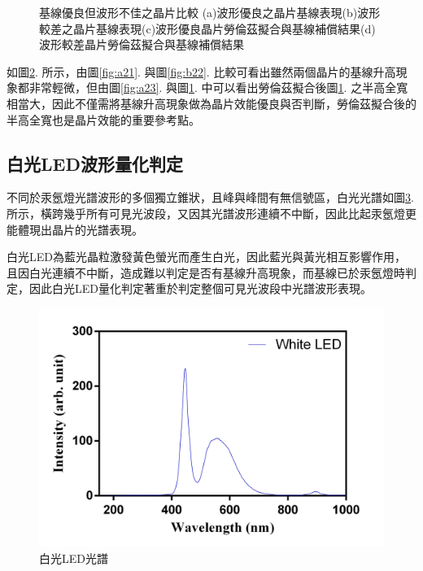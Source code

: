 \begin{figure}[H]
\begin{subfigure}[fig nice]{0.49\textwidth}
	\caption{}
	\label{fig:b24}
\end{subfigure}
	\caption[基線優良但波形不佳之晶片比較]{基線優良但波形不佳之晶片比較 (a)波形優良之晶片基線表現(b)波形較差之晶片基線表現(c)波形優良晶片勞倫茲擬合與基線補償結果(d)波形較差晶片勞倫茲擬合與基線補償結果}
	\label{fig:all2}
\end{figure}  
如圖\ref{fig:all2}. 所示，由圖\ref{fig:a21}. 與圖\ref{fig:b22}. 比較可看出雖然兩個晶片的基線升高現象都非常輕微，但由圖\ref{fig:a23}. 與圖\ref{fig:b24}. 中可以看出勞倫茲擬合後圖\ref{fig:b24}. 之半高全寬相當大，因此不僅需將基線升高現象做為晶片效能優良與否判斷，勞倫茲擬合後的半高全寬也是晶片效能的重要參考點。

\subsection{白光LED波形量化判定}
不同於汞氬燈光譜波形的多個獨立錐狀，且峰與峰間有無信號區，白光光譜如圖\ref{白光LED光譜}. 所示，橫跨幾乎所有可見光波段，又因其光譜波形連續不中斷，因此比起汞氬燈更能體現出晶片的光譜表現。\par
白光LED為藍光晶粒激發黃色螢光而產生白光，因此藍光與黃光相互影響作用，且因白光連續不中斷，造成難以判定是否有基線升高現象，而基線已於汞氬燈時判定，因此白光LED量化判定著重於判定整個可見光波段中光譜波形表現。\par
\begin{figure}[H] %
	\centering %
	\vspace{0.8cm}
	\setlength{\abovecaptionskip}{0.cm}
	\includegraphics[width=\textwidth]{figures/White_wavelenght.png} %
	\caption{白光LED光譜} %
	\label{白光LED光譜} %
\end{figure}
